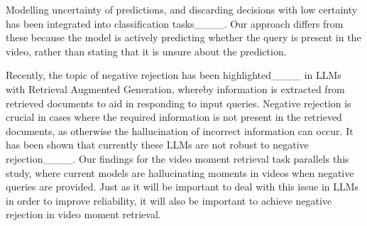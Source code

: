 Modelling uncertainty of predictions, and discarding decisions with low certainty has been integrated into classification tasks____.
Our approach differs from these because the model is actively predicting whether the query is present in the video, rather than stating that it is unsure about the prediction.

Recently, the topic of negative rejection has been highlighted____ in LLMs with Retrieval Augmented Generation, whereby information is extracted from retrieved documents to aid in responding to input queries. Negative rejection is crucial in cases where the required information is not present in the retrieved documents, as otherwise the hallucination of incorrect information can occur. It has been shown that currently these LLMs are not robust to negative rejection____. Our findings for the video moment retrieval task parallels this study, where current models are hallucinating moments in videos when negative queries are provided. Just as it will be important to deal with this issue in LLMs in order to improve reliability, it will also be important to achieve negative rejection in video moment retrieval.
